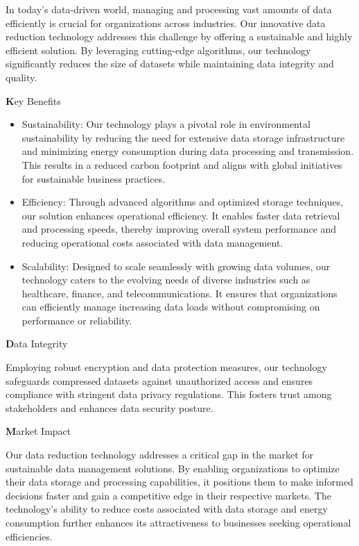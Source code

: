 In today's data-driven world, managing and processing vast amounts of data efficiently is crucial for organizations across industries. Our innovative data reduction technology addresses this challenge by offering a sustainable and highly efficient solution. By leveraging cutting-edge algorithms, our technology significantly reduces the size of datasets while maintaining data integrity and quality.

{\textbf Key Benefits}

\begin{itemize}
\item Sustainability: Our technology plays a pivotal role in environmental sustainability by reducing the need for extensive data storage infrastructure and minimizing energy consumption during data processing and transmission. This results in a reduced carbon footprint and aligns with global initiatives for sustainable business practices.

\item Efficiency: Through advanced algorithms and optimized storage techniques, our solution enhances operational efficiency. It enables faster data retrieval and processing speeds, thereby improving overall system performance and reducing operational costs associated with data management.

\item Scalability: Designed to scale seamlessly with growing data volumes, our technology caters to the evolving needs of diverse industries such as healthcare, finance, and telecommunications. It ensures that organizations can efficiently manage increasing data loads without compromising on performance or reliability.

\end{itemize}

{\textbf Data Integrity}

Employing robust encryption and data protection measures, our technology safeguards compressed datasets against unauthorized access and ensures compliance with stringent data privacy regulations. This fosters trust among stakeholders and enhances data security posture.

{\textbf Market Impact}

Our data reduction technology addresses a critical gap in the market for sustainable data management solutions. By enabling organizations to optimize their data storage and processing capabilities, it positions them to make informed decisions faster and gain a competitive edge in their respective markets. The technology's ability to reduce costs associated with data storage and energy consumption further enhances its attractiveness to businesses seeking operational efficiencies.

